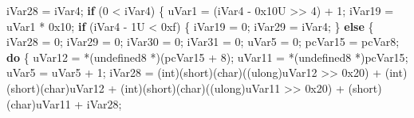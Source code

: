 \documentclass[
]{article}
\newenvironment{Shaded}{}{}
\newcommand{\BaseNTok}[1]{\textcolor[rgb]{0.25,0.63,0.44}{#1}}
\newcommand{\BuiltInTok}[1]{\textcolor[rgb]{0.00,0.50,0.00}{#1}}
\newcommand{\ControlFlowTok}[1]{\textcolor[rgb]{0.00,0.44,0.13}{\textbf{#1}}}
\newcommand{\DataTypeTok}[1]{\textcolor[rgb]{0.56,0.13,0.00}{#1}}
\newcommand{\DecValTok}[1]{\textcolor[rgb]{0.25,0.63,0.44}{#1}}
\newcommand{\ExtensionTok}[1]{#1}
\newcommand{\NormalTok}[1]{#1}
\newcommand{\OperatorTok}[1]{\textcolor[rgb]{0.40,0.40,0.40}{#1}}
\begin{document}
\begin{Shaded}
\begin{Highlighting}[]
\NormalTok{  iVar28 }\OperatorTok{=}\NormalTok{ iVar4}\OperatorTok{;}
  \ControlFlowTok{if} \OperatorTok{(}\DecValTok{0} \OperatorTok{\textless{}}\NormalTok{ iVar4}\OperatorTok{)} \OperatorTok{\{}
\NormalTok{    uVar1 }\OperatorTok{=} \OperatorTok{(}\NormalTok{iVar4 }\OperatorTok{{-}} \BaseNTok{0x10}\BuiltInTok{U} \OperatorTok{\textgreater{}\textgreater{}} \DecValTok{4}\OperatorTok{)} \OperatorTok{+} \DecValTok{1}\OperatorTok{;}
\NormalTok{    iVar19 }\OperatorTok{=}\NormalTok{ uVar1 }\OperatorTok{*} \BaseNTok{0x10}\OperatorTok{;}
    \ControlFlowTok{if} \OperatorTok{(}\NormalTok{iVar4 }\OperatorTok{{-}} \DecValTok{1}\BuiltInTok{U} \OperatorTok{\textless{}} \BaseNTok{0xf}\OperatorTok{)} \OperatorTok{\{}
\NormalTok{      iVar19 }\OperatorTok{=} \DecValTok{0}\OperatorTok{;}
\NormalTok{      iVar29 }\OperatorTok{=}\NormalTok{ iVar4}\OperatorTok{;}
    \OperatorTok{\}}
    \ControlFlowTok{else} \OperatorTok{\{}
\NormalTok{      iVar28 }\OperatorTok{=} \DecValTok{0}\OperatorTok{;}
\NormalTok{      iVar29 }\OperatorTok{=} \DecValTok{0}\OperatorTok{;}
\NormalTok{      iVar30 }\OperatorTok{=} \DecValTok{0}\OperatorTok{;}
\NormalTok{      iVar31 }\OperatorTok{=} \DecValTok{0}\OperatorTok{;}
\NormalTok{      uVar5 }\OperatorTok{=} \DecValTok{0}\OperatorTok{;}
\NormalTok{      pcVar15 }\OperatorTok{=}\NormalTok{ pcVar8}\OperatorTok{;}
      \ControlFlowTok{do} \OperatorTok{\{}
\NormalTok{        uVar12 }\OperatorTok{=} \OperatorTok{*(}\NormalTok{undefined8 }\OperatorTok{*)(}\NormalTok{pcVar15 }\OperatorTok{+} \DecValTok{8}\OperatorTok{);}
\NormalTok{        uVar11 }\OperatorTok{=} \OperatorTok{*(}\NormalTok{undefined8 }\OperatorTok{*)}\NormalTok{pcVar15}\OperatorTok{;}
\NormalTok{        uVar5 }\OperatorTok{=}\NormalTok{ uVar5 }\OperatorTok{+} \DecValTok{1}\OperatorTok{;}
\NormalTok{        iVar28 }\OperatorTok{=} \OperatorTok{(}\DataTypeTok{int}\OperatorTok{)(}\DataTypeTok{short}\OperatorTok{)(}\DataTypeTok{char}\OperatorTok{)((}\ExtensionTok{ulong}\OperatorTok{)}\NormalTok{uVar12 }\OperatorTok{\textgreater{}\textgreater{}} \BaseNTok{0x20}\OperatorTok{)} \OperatorTok{+}
                 \OperatorTok{(}\DataTypeTok{int}\OperatorTok{)(}\DataTypeTok{short}\OperatorTok{)(}\DataTypeTok{char}\OperatorTok{)}\NormalTok{uVar12 }\OperatorTok{+}
                 \OperatorTok{(}\DataTypeTok{int}\OperatorTok{)(}\DataTypeTok{short}\OperatorTok{)(}\DataTypeTok{char}\OperatorTok{)((}\ExtensionTok{ulong}\OperatorTok{)}\NormalTok{uVar11 }\OperatorTok{\textgreater{}\textgreater{}} \BaseNTok{0x20}\OperatorTok{)} \OperatorTok{+} \OperatorTok{(}\DataTypeTok{short}\OperatorTok{)(}\DataTypeTok{char}\OperatorTok{)}\NormalTok{uVar11 }\OperatorTok{+}\NormalTok{ iVar28}\OperatorTok{;}

\end{Highlighting}
\end{Shaded}
\end{document}
